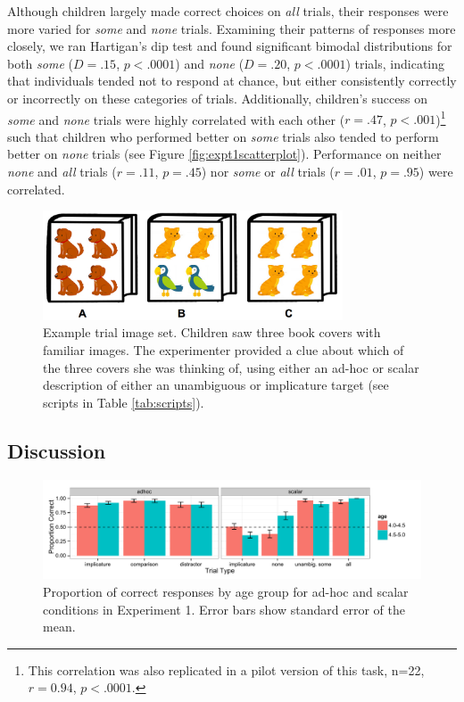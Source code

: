 \documentclass[10pt,letterpaper]{article}
\begin{document}
Although children largely made correct choices on \emph{all} trials, their responses were more varied for \emph{some} and \emph{none} trials.  Examining their patterns of responses more closely, we ran Hartigan's dip test and found significant bimodal distributions for both \emph{some} ($D=.15$, $p<.0001$) and \emph{none} ($D=.20$, $p<.0001$) trials, indicating that individuals tended not to respond at chance, but either consistently correctly or incorrectly on these categories of trials. Additionally, children's success on \emph{some} and \emph{none} trials were highly correlated with each other ($r=.47$, $p<.001$)\footnote{This correlation was also replicated in a pilot version of this task, n=22, $r=0.94$, $p<.0001$.} such that children who performed better on \emph{some} trials also tended to perform better on \emph{none} trials (see Figure \ref{fig:expt1scatterplot}). Performance on neither \emph{none} and \emph{all} trials ($r=.11$, $p=.45$) nor \emph{some} or \emph{all} trials ($r=.01$, $p=.95$) were correlated.

 \begin{figure}[h] 
  \begin{center} 
    \includegraphics[width=3.5in]{figures/implicatures_demo_letters.png} 
    \caption{\label{fig:demo} Example trial image set. Children saw three book covers with familiar images. The experimenter provided a clue about which of the three covers she was thinking of, using either an ad-hoc or scalar description of either an unambiguous or implicature target (see scripts in Table \ref{tab:scripts}).}
    \end{center} 
\end{figure}

\subsection{Discussion}

\begin{figure}[t] 
  \begin{center} 
    \includegraphics[width=7.5in]{figures/implicatures_adhocScalar_long.pdf} 
    \caption{\label{fig:expt1} Proportion of correct responses by age group for ad-hoc and scalar conditions in Experiment 1. Error bars show standard error of the mean.}
    \end{center} 
\end{figure}
\end{document}
